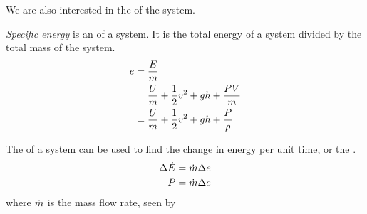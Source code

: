 We are also interested in the  of the system.
\begin{definition}\label{def:Specific_Energy}
  \emph{Specific energy} is an  of a system.
  It is the total energy of a system divided by the total mass of the system.
  \begin{equation}\label{eq:Specific_Energy}
    \begin{aligned}
      e &= \frac{E}{m} \\
      &= \frac{U}{m} + \frac{1}{2} v^{2} + g h + \frac{P V}{m} \\
      &= \frac{U}{m} + \frac{1}{2} v^{2} + g h + \frac{P}{\rho} \\
    \end{aligned}
  \end{equation}
\end{definition}

The  of a system can be used to find the change in energy per unit time, or the .
\begin{equation}\label{eq:Energy_Flow_Rate}
  \begin{aligned}
    \Delta \dot{E} &= \dot{m} \Delta e \\
    P &= \dot{m} \Delta e \\
  \end{aligned}
\end{equation}
where $\dot{m}$ is the mass flow rate, seen by 


